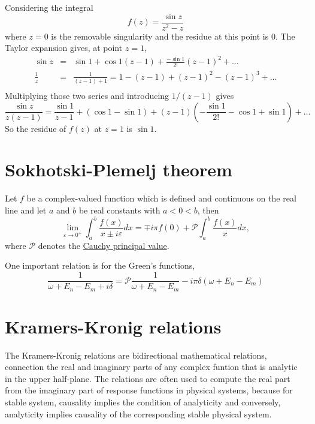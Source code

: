 Considering the integral
\begin{equation*}
  f(z)= \frac{\sin z}{z^2-z}
\end{equation*}
where $z=0$ is the removable singularity and the residue at this point is $0$.
The Taylor expansion gives, at point $z=1$,
\begin{eqnarray*}
    \sin z &=& \sin 1 + \cos 1 (z-1) + \frac{-\sin 1}{2!}(z-1)^2 + \dots \\
    \frac{1}{z} &=& \frac{1}{(z-1)+1} = 1 -(z-1) +(z-1)^2 -(z-1)^3 + \dots \\
\end{eqnarray*}
Multiplying those two series and introducing $1/(z-1)$ gives
\begin{equation*}
  \frac{\sin z}{z(z-1)} = \frac{\sin 1}{z-1} + (\cos 1 - \sin 1) + (z-1)(-\frac{\sin 1}{2!} - \cos 1 + \sin 1) + \dots
\end{equation*}
So the residue of $f(z)$ at $z=1$ is $\sin 1$.

\section{Sokhotski-Plemelj theorem}
Let $f$ be a complex-valued function which is defined and continuous on the real line and let $a$ and $b$ be real constants with $a<0<b$, then
\begin{equation*}
  \lim_{\varepsilon\to 0^+} \int_a^b \frac{f(x)}{x\pm i\varepsilon}dx = \mp i\pi f(0) + \mathcal{P} \int_a^b \frac{f(x)}{x} dx,
\end{equation*}
where $\mathcal{P}$ denotes the \href{https://en.wikipedia.org/wiki/Cauchy_principal_value}{Cauchy principal value}.

One important relation is for the Green's functions,
\begin{equation*}
  \frac{1}{\omega + E_n - E_m + i\delta} = \mathcal{P} \frac{1}{\omega + E_n -E_m} - i\pi \delta(\omega +E_n -E_m)
\end{equation*}

\section{Kramers-Kronig relations}
The Kramers-Kronig relations are bidirectional mathematical relations, connection the real and imaginary parts of any complex funtion that is analytic in the upper half-plane.
The relations are often used to compute the real part from the imaginary part of response functions in physical systems, because for stable system, causality implies the condition of analyticity and conversely, analyticity implies causality of the corresponding stable physical system.

